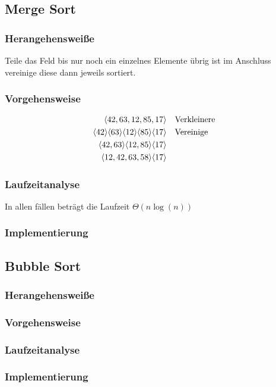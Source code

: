 \documentclass[10pt,a4paper]{article}
\begin{document}
\begin{multicols*}{4}
\subsection{Merge Sort}
\subsubsection*{Herangehensweiße}
Teile das Feld bis nur noch ein einzelnes Elemente übrig ist im Anschluss vereinige diese dann jeweils sortiert.
\subsubsection*{Vorgehensweise}
\begin{align*}
	\langle42,63,12,85,17\rangle                             & \quad\text{Verkleinere} \\
	\langle42\rangle\langle63\rangle\langle12\rangle\langle85\rangle\langle17\rangle & \quad\text{Vereinige}   \\
	\langle42,63\rangle\langle12,85\rangle\langle17\rangle               &                         \\
	\langle12,42,63,58\rangle\langle17\rangle
\end{align*}
\subsubsection*{Laufzeitanalyse}
In allen fällen beträgt die Laufzeit \(\Theta(n\log(n))\)
\subsubsection*{Implementierung}

\subsection{Bubble Sort}
\subsubsection*{Herangehensweiße}
\subsubsection*{Vorgehensweise}
\subsubsection*{Laufzeitanalyse}
\subsubsection*{Implementierung}


\end{multicols*}
\end{document}
